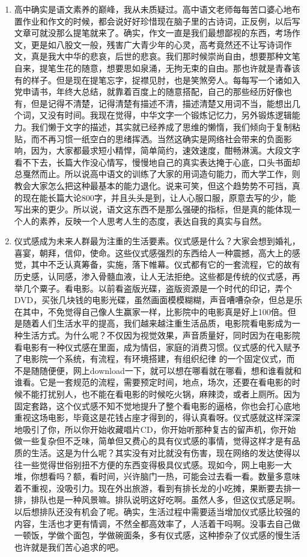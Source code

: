 \documentclass[color=green,mathpazo,titlestyle=hang]{elegantbook}
\begin{document}
\begin{enumerate}
	\item 
	{\color{main}高中确实是语文素养的巅峰，我从未质疑过。}高中语文老师每每苦口婆心地布置作业和作文的时候，都会说好好珍惜现在脑子里的古诗词，正反例，以后写文章可就没那么提笔就来了。确实，作文一直是我们最想鄙视的东西，考场作文，更是如八股文一般，残害广大青少年的心灵，高考竟然还不让写诗词作文，真是我大中华的悲哀，后世的悲哀。我们那时候崇尚自由，想要那种文笔自来，提笔生花的随意，想要思如泉涌，无拘无束的自由。那也许就是青春该有的样子。但是现在提笔忘字，捉襟见肘，也是笑煞旁人。每每写一个诸如入党申请书，年终大总结，就靠着百度上的随意搭配，自己的那些经历好像也有，但是记得不清楚，记得清楚有描述不清，描述清楚又用词不当，能想出几个词，又没有时间。我现在觉得，中华文字一个锻炼记忆力，另外锻炼逻辑能力。我们懒于文字的描述，其实就已经养成了思维的懒惰，我们倾向于复制粘贴，而不再习惯一纸空白的思绪挥洒。当然这确实是网络社会带来的负面影响，因为，大家都最求短小精悍，简单简约，速效速度，酣畅淋漓。大段文字看不下去，长篇大作没心情写，慢慢地自己的真实表达掩于心底，口头书面却总戛然而止。所以说高中语文的训练了大家的用词造句能力，而大学工作，则教会大家怎么把这种最基本的能力退化。说来可笑，但这个趋势势不可挡，真的现在能长篇大论800字，并且头头是到，让人心服口服，原意去写的少，能写出来的更少。所以说，语文这东西不是那么强硬的指标，但是真的能体现一个人的素养，反映一个人思考人生的态度，表达自我的真实与自然。
	\item {\color{main}仪式感成为未来人群最为注重的生活要素。}仪式感是什么？大家会想到婚礼，喜宴，朝拜，信仰，使命。这些仪式感强烈的东西给人一种震撼，高大上的感觉，其中不乏认真筹备，实施，落下帷幕。仪式都有它的一套流程，它的故有历史感，认同感，渗入骨髓血液，让人无法拒绝。这些都是传统的仪式感，再举几个粟子。看电影。以前看盗版光碟，盗版资源是一个时代的印记，弄个DVD，买张几块钱的电影光碟，虽然画面模模糊糊，声音嘈嘈杂杂，但总是乐在其中，不免觉得自己像人生赢家一样，比影院中的电影真是好上100倍。但是随着人们生活水平的提高，我们越来越注重生活品质，电影院看电影成为一种生活方式。为什么呢？不仅因为视觉效果，声音质量好，同时因为在电影院看电影有一种仪式感在里面，成为情侣，家庭的消费习惯。仪式感的代入赋予了电影院一个系统，有流程，有环境搭建，有组织纪律 的一个固定仪式，而不是随随便便，网上download一下，就可以想在哪看就在哪看，想和谁看就和谁看。它是一套规范的流程，需要预定时间，地点，场次，还要在看电影的时候不能打扰别人，也不能在看电影的时候吃火锅，麻辣烫，或者上厕所。因为固定套路，这个仪式感不知不觉地提升了整个看电影的逼格，你也会打心底地重视这场电影，毕竟这是花钱占座才得到的，得认真看呀。仪式感就这样深深地吸引了你，所以你开始收藏唱片CD，你开始听那种复古的留声机，你开始做一些复杂但不乏味，简单但又费心的具有仪式感的事情，觉得这样才是有品质的生活。这是为什么呢？其实没有对比就没有伤害，现在网络的发达使得以往一些觉得世俗别扭不方便的东西变得极具仪式感。现如今，网上电影一大堆，你想看吗？额，看时间，兴许脑门一热，可能会过去看一看。数量多意味着不重视，没吸引力。现在外出旅游，看到有排长龙的小吃摊，果断要去排一排，排队也是一种风景嘛。排队说明这好吃啊。虽然人多，但这仪式感足啊。以后想排队还没有机会了呢。确实，生活过程中需要适当增加仪式感比较强的内容，生活也才更有情调，不然全都高效率了，人活着干吗啊。没事去自己做一顿饭，学做个面包，学做碗面条，多有仪式感，这种掺杂了仪式感的慢生活也许就是我们苦心追求的吧。

\end{enumerate}
\end{document}
